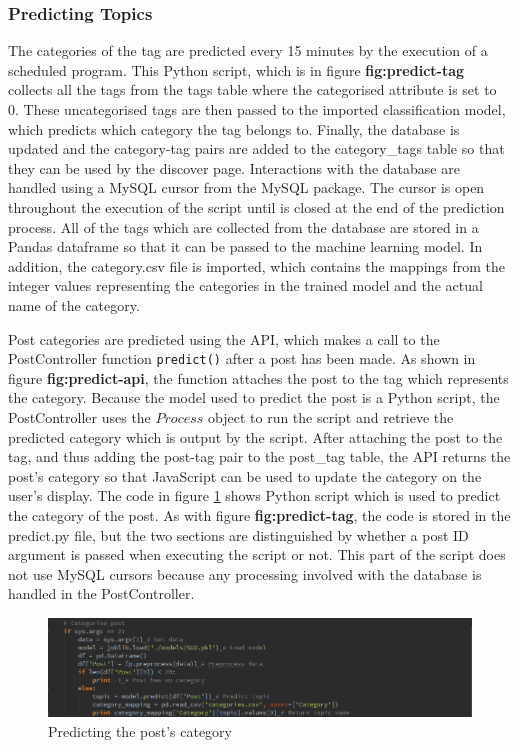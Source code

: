 \subsubsection{Predicting Topics}
The categories of the tag are predicted every 15 minutes by the execution of a scheduled program. This Python script, which is in figure \textbf{fig:predict-tag} collects all the tags from the tags table where the categorised attribute is set to 0. These uncategorised tags are then passed to the imported classification model, which predicts which category the tag belongs to. Finally, the database is updated and the category-tag pairs are added to the category\_tags table so that they can be used by the discover page. Interactions with the database are handled using a MySQL cursor from the MySQL package. The cursor is open throughout the execution of the script until is closed at the end of the prediction process. All of the tags which are collected from the database are stored in a Pandas dataframe so that it can be passed to the machine learning model. In addition, the category.csv file is imported, which contains the mappings from the integer values representing the categories in the trained model and the actual name of the category.

Post categories are predicted using the API, which makes a call to the PostController function \texttt{predict()} after a post has been made. As shown in figure \textbf{fig:predict-api}, the function attaches the post to the tag which represents the category. Because the model used to predict the post is a Python script, the PostController uses the $Process$ object to run the script and retrieve the predicted category which is output by the script. After attaching the post to the tag, and thus adding the post-tag pair to the post\_tag table, the API returns the post's category so that JavaScript can be used to update the category on the user's display. The code in figure \ref{fig:predict-post} shows Python script which is used to predict the category of the post. As with figure \textbf{fig:predict-tag}, the code is stored in the predict.py file, but the two sections are distinguished by whether a post ID argument is passed when executing the script or not. This part of the script does not use MySQL cursors because any processing involved with the database is handled in the PostController. 

\begin{figure}[H]
\centering
\includegraphics[width=\textwidth]{Images/Implementation/predict-post}
\caption{Predicting the post's category}
\label{fig:predict-post}
\end{figure}

